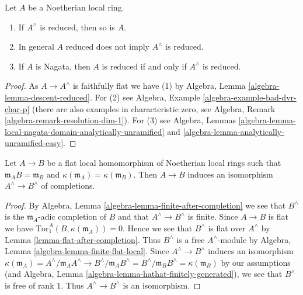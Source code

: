\begin{lemma}
\label{lemma-completion-reduced}
Let $A$ be a Noetherian local ring.
\begin{enumerate}
\item If $A^\wedge$ is reduced, then so is $A$.
\item In general $A$ reduced does not imply $A^\wedge$ is reduced.
\item If $A$ is Nagata, then $A$ is reduced if and only if $A^\wedge$
is reduced.
\end{enumerate}
\end{lemma}

\begin{proof}
As $A \to A^\wedge$ is faithfully flat we have (1) by
Algebra, Lemma \ref{algebra-lemma-descent-reduced}.
For (2) see Algebra, Example \ref{algebra-example-bad-dvr-char-p}
(there are also examples in characteristic zero, see
Algebra, Remark \ref{algebra-remark-resolution-dim-1}).
For (3) see Algebra, Lemmas
\ref{algebra-lemma-local-nagata-domain-analytically-unramified} and
\ref{algebra-lemma-analytically-unramified-easy}.
\end{proof}

\begin{lemma}
\label{lemma-flat-unramified}
Let $A \to B$ be a flat local homomorphism of Noetherian local rings
such that $\mathfrak m_A B = \mathfrak m_B$ and
$\kappa(\mathfrak m_A) = \kappa(\mathfrak m_B)$.
Then $A \to B$ induces an isomorphism $A^\wedge \to B^\wedge$
of completions.
\end{lemma}

\begin{proof}
By Algebra, Lemma \ref{algebra-lemma-finite-after-completion} we see that
$B^\wedge$ is the $\mathfrak m_A$-adic
completion of $B$ and that $A^\wedge \to B^\wedge$ is finite.
Since $A \to B$ is flat we have $\text{Tor}_1^A(B, \kappa(\mathfrak m_A)) = 0$.
Hence we see that $B^\wedge$ is flat over $A^\wedge$ by
Lemma \ref{lemma-flat-after-completion}.
Thus $B^\wedge$ is a free $A^\wedge$-module by
Algebra, Lemma \ref{algebra-lemma-finite-flat-local}.
Since $A^\wedge \to B^\wedge$ induces an isomorphism
$\kappa(\mathfrak m_A) = A^\wedge/\mathfrak m_A A^\wedge \to
B^\wedge/\mathfrak m_A B^\wedge = B^\wedge/\mathfrak m_B B^\wedge =
\kappa(\mathfrak m_B)$ by our assumptions
(and Algebra, Lemma \ref{algebra-lemma-hathat-finitely-generated}),
we see that $B^\wedge$ is free of rank $1$. Thus $A^\wedge \to B^\wedge$
is an isomorphism.
\end{proof}





